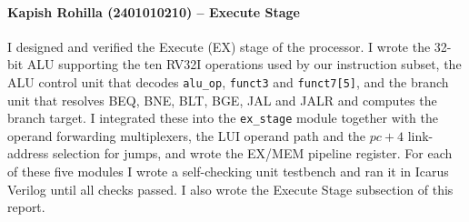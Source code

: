 \paragraph{Kapish Rohilla (2401010210) -- Execute Stage}
I designed and verified the Execute (EX) stage of the processor. I wrote the
32-bit ALU supporting the ten RV32I operations used by our instruction subset,
the ALU control unit that decodes \texttt{alu\_op}, \texttt{funct3} and
\texttt{funct7[5]}, and the branch unit that resolves BEQ, BNE, BLT, BGE, JAL
and JALR and computes the branch target. I integrated these into the
\texttt{ex\_stage} module together with the operand forwarding multiplexers,
the LUI operand path and the $\mathit{pc}+4$ link-address selection for jumps,
and wrote the EX/MEM pipeline register. For each of these five modules I wrote
a self-checking unit testbench and ran it in Icarus Verilog until all checks
passed. I also wrote the Execute Stage subsection of this report.
